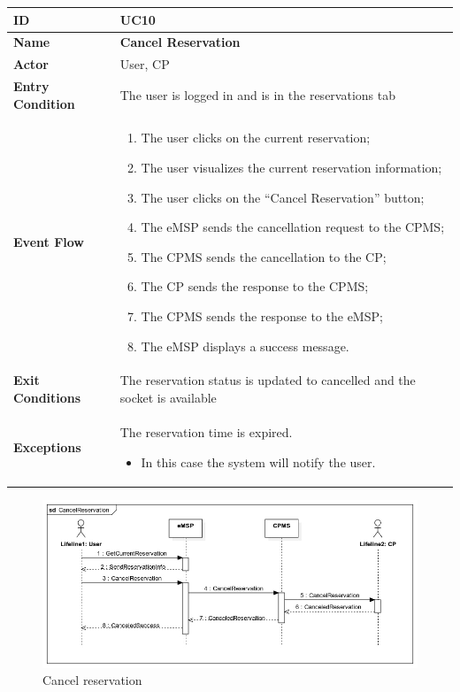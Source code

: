 \documentclass{Configuration_Files/PoliMi3i_thesis}
\begin{document}
\begin{table}[H]
    \begin{xltabular}{\textwidth}{| >{}l | X |}
    \hline
    \textbf{ID} & \textbf{UC10}\T\B\\
    \hline
    \textbf{Name} & \textbf{Cancel Reservation}\T\B\\
    \hline \hline
    \textbf{Actor} & User, CP\T\B \\
    \hline
    \textbf{Entry Condition} & The user is logged in and is in the reservations tab\T\B\\
    \hline
    \textbf{Event Flow} & 
        \begin{enumerate}
        \item The user clicks on the current reservation;
        \item The user visualizes the current reservation information;
        \item The user clicks on the “Cancel Reservation” button;
        \item The eMSP sends the cancellation request to the CPMS;
        \item The CPMS sends the cancellation to the CP;
        \item The CP sends the response to the CPMS;
        \item The CPMS sends the response to the eMSP;
        \item The eMSP displays a success message.
        \end{enumerate}\B\\
    \hline
    \textbf{Exit Conditions} & The reservation status is updated to cancelled and the socket is available\B\\
    \hline
    \textbf{Exceptions} & 
    The reservation time is expired.
    \begin{itemize}
        \item In this case the system will notify the user.
    \end{itemize}\B\\
    \hline
    \end{xltabular}
\end{table}

\begin{figure}[H]
    \centering
    \includegraphics[width=1\textwidth]{Images/UseCases/CancelReservation.jpg}
    \caption{Cancel reservation}
\end{figure}
\end{document}
